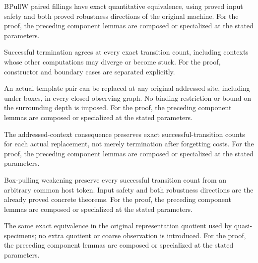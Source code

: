 BPullW paired fillings have exact quantitative equivalence, using proved input safety and both proved robustness directions of the original machine.
For the proof, the preceding component lemmas are composed or specialized at the stated parameters.
\par{}

Successful termination agrees at every exact transition count, including contexts whose other computations may diverge or become stuck.
For the proof, constructor and boundary cases are separated explicitly.
\par{}

An actual template pair can be replaced at any original addressed site, including under boxes, in every closed observing graph. No binding restriction or bound on the surrounding depth is imposed.
For the proof, the preceding component lemmas are composed or specialized at the stated parameters.
\par{}

The addressed-context consequence preserves exact successful-transition counts for each actual replacement, not merely termination after forgetting costs.
For the proof, the preceding component lemmas are composed or specialized at the stated parameters.
\par{}

Box-pulling weakening preserve every successful transition count from an arbitrary common host token. Input safety and both robustness directions are the already proved concrete theorems.
For the proof, the preceding component lemmas are composed or specialized at the stated parameters.
\par{}

The same exact equivalence in the original representation quotient used by quasi-specimens; no extra quotient or coarse observation is introduced.
For the proof, the preceding component lemmas are composed or specialized at the stated parameters.
\par{}

